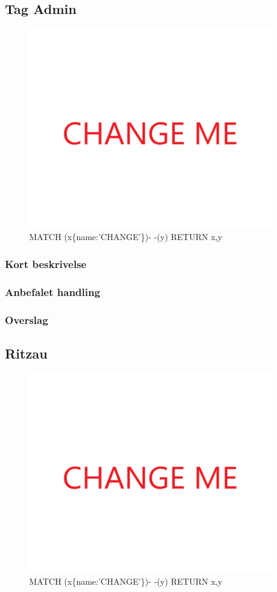 \documentclass{article}
\begin{document}
\subsection{Tag Admin}
\begin{figure}[h]
\includegraphics[width=300pt]{CHANGE.PNG}
\caption{MATCH (x\{name:'CHANGE'\})- -(y) RETURN x,y}
\end{figure}
\subsubsection{Kort beskrivelse}
\subsubsection{Anbefalet handling}
\subsubsection{Overslag}


\subsection{Ritzau}
\begin{figure}[h]
\includegraphics[width=300pt]{CHANGE.PNG}
\caption{MATCH (x\{name:'CHANGE'\})- -(y) RETURN x,y}
\end{figure}
\end{document}
